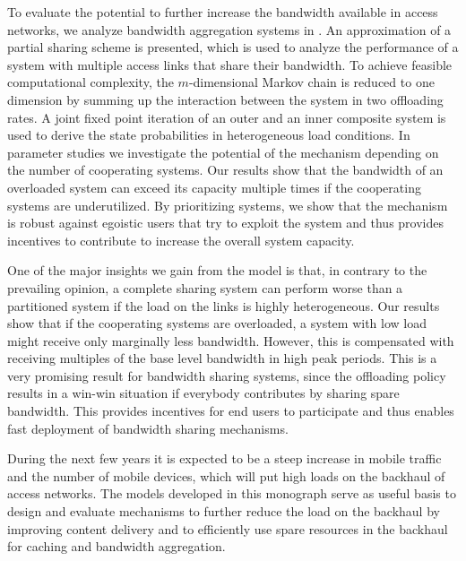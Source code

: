 To evaluate the potential to further increase the bandwidth available in access networks, we analyze bandwidth aggregation systems in .
An approximation of a partial sharing scheme is presented, which is used to analyze the performance of a system with multiple access links that share their bandwidth.
To achieve feasible computational complexity, the $m$-dimensional Markov chain is reduced to one dimension by summing up the interaction between the system in two offloading rates.
A joint fixed point iteration of an outer and an inner composite system is used to derive the state probabilities in heterogeneous load conditions.
In parameter studies we investigate the potential of the mechanism depending on the number of cooperating systems.
Our results show that the bandwidth of an overloaded system can exceed its capacity multiple times if the cooperating systems are underutilized.
By prioritizing systems, we show that the mechanism is robust against egoistic users that try to exploit the system and thus provides incentives to contribute to increase the overall system capacity.

One of the major insights we gain from the model is that, in contrary to the prevailing opinion, a complete sharing system can perform worse than a partitioned system if the load on the links is highly heterogeneous.
Our results show that if the cooperating systems are overloaded, a system with low load might receive only marginally less bandwidth.
However, this is compensated with receiving multiples of the base level bandwidth in high peak periods.
This is a very promising result for bandwidth sharing systems, since the offloading policy results in a win-win situation if everybody contributes by sharing spare bandwidth.
This provides incentives for end users to participate and thus enables fast deployment of bandwidth sharing mechanisms.

During the next few years it is expected to be a steep increase in mobile traffic and the number of mobile devices, which will put high loads on the backhaul of access networks.
The models developed in this monograph serve as useful basis to design and evaluate mechanisms to further reduce the load on the backhaul by improving content delivery and to efficiently use spare resources in the backhaul for caching and bandwidth aggregation.
